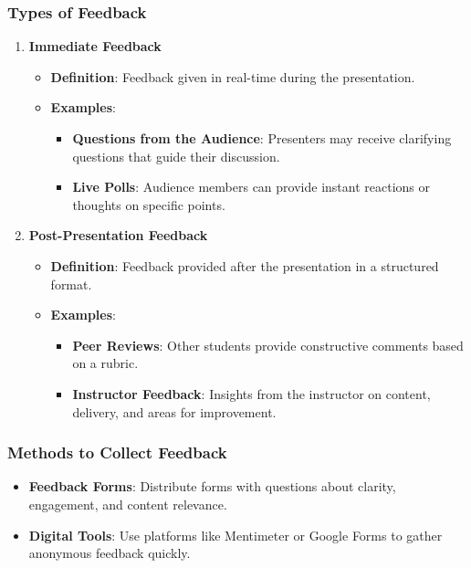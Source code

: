 \documentclass[aspectratio=169]{beamer}
\begin{document}
\begin{frame}[fragile]
    \frametitle{Types of Feedback}
    \begin{enumerate}
        \item \textbf{Immediate Feedback}
        \begin{itemize}
            \item \textbf{Definition}: Feedback given in real-time during the presentation.
            \item \textbf{Examples}:
            \begin{itemize}
                \item \textbf{Questions from the Audience}: Presenters may receive clarifying questions that guide their discussion.
                \item \textbf{Live Polls}: Audience members can provide instant reactions or thoughts on specific points.
            \end{itemize}
        \end{itemize}
        
        \item \textbf{Post-Presentation Feedback}
        \begin{itemize}
            \item \textbf{Definition}: Feedback provided after the presentation in a structured format.
            \item \textbf{Examples}:
            \begin{itemize}
                \item \textbf{Peer Reviews}: Other students provide constructive comments based on a rubric.
                \item \textbf{Instructor Feedback}: Insights from the instructor on content, delivery, and areas for improvement.
            \end{itemize}
        \end{itemize}
    \end{enumerate}
\end{frame}

\begin{frame}[fragile]
    \frametitle{Methods to Collect Feedback}
    \begin{itemize}
        \item \textbf{Feedback Forms}: Distribute forms with questions about clarity, engagement, and content relevance.
        \item \textbf{Digital Tools}: Use platforms like Mentimeter or Google Forms to gather anonymous feedback quickly.
    \end{itemize}
\end{frame}
\end{document}

